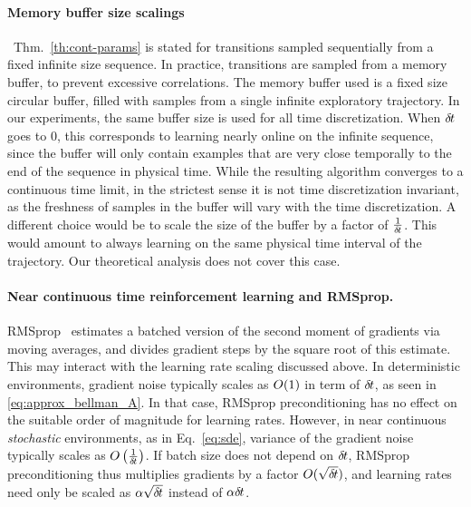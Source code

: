 \paragraph{Memory buffer size scalings}~Thm.~\ref{th:cont-params} is stated for
transitions sampled sequentially from a fixed infinite size sequence. In practice,
transitions are sampled from a memory buffer, to prevent excessive correlations.
The memory buffer used is a fixed size circular buffer, filled
with samples from a single infinite exploratory trajectory. In
our experiments, the same buffer size is used for all time discretization. When
${\delta\hspace{-.1em}t}$ goes to $0$, this corresponds to learning nearly online on the
infinite sequence, since the buffer will only contain examples that are very
close temporally to the end of the sequence in physical time.  While the resulting
algorithm converges to a continuous time limit, in the strictest sense it is not
time discretization invariant, as the freshness of samples in the buffer will
vary with the time discretization.
A different choice would be to scale the size of the buffer by a factor of
$\frac{1}{{\delta\hspace{-.1em}t}}$. This would amount to always learning on the same physical time interval of
the trajectory. Our theoretical analysis does not cover this case.

\paragraph{Near continuous time reinforcement learning and RMSprop.} RMSprop~\cite{rmsprop}
estimates a batched version of the second moment of gradients via moving
averages, and divides gradient steps by the square root of this estimate.
This may interact with the learning rate scaling discussed above. In
deterministic environments, gradient noise typically scales as $O(1)$ in
term of ${\delta\hspace{-.1em}t}$, as seen in \eqref{eq:approx_bellman_A}.  In that case, RMSprop
preconditioning has no effect on the suitable order of magnitude for learning
rates. However, in near continuous \emph{stochastic} environments, as in
Eq.~\ref{eq:sde}, variance of the gradient noise typically scales as
$O\left(\frac{1}{{\delta\hspace{-.1em}t}}\right)$. If batch size does not depend on
${\delta\hspace{-.1em}t}$, RMSprop preconditioning thus multiplies gradients by a factor $O(\sqrt{{\delta\hspace{-.1em}t}})$,
and learning rates need only be scaled as $\alpha \sqrt{{\delta\hspace{-.1em}t}}$ instead of
$\alpha {\delta\hspace{-.1em}t}$.
